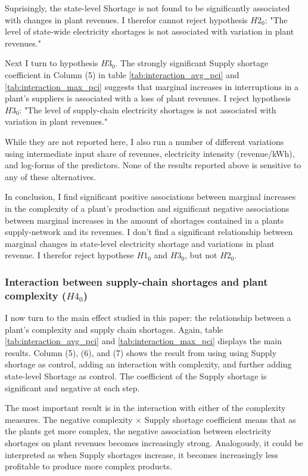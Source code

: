 \documentclass[11pt]{article}
\begin{document}
Suprisingly, the state-level Shortage is not found to be significantly associated with changes in plant revenues. I therefor cannot reject hypothesis $H2_0$: "The level of state-wide electricity shortages is not associated with variation in plant revenues." 

Next I turn to hypothesis $H3_0$. The strongly significant Supply shortage coefficient in Column (5) in table \ref{tab:interaction_avg_pci} and \ref{tab:interaction_max_pci} suggests that marginal increases in interruptions in a plant's suppliers is associated with a loss of plant revenues. I reject hypothesis $H3_0$: "The level of supply-chain electricity shortages is not associated with variation in plant revenues." 

While they are not reported here, I also run a number of different variations using intermediate input share of revenues, electricity intensity (revenue/kWh), and log-forms of the predictors. None of the results reported above is sensitive to any of these alternatives.

In conclusion, I find significant positive associations between marginal increases in the complexity of a plant's production and significant negative associations between marginal increases in the amount of shortages contained in a plants supply-network and its revenues. I don't find a significant relationship between marginal changes in state-level electricity shortage and variations in plant revenue. I therefor reject hypothese $H1_0$ and $H3_0$, but not $H2_0$.

\subsubsection{Interaction between supply-chain shortages and plant complexity ($H4_0$)}
\label{sub:h4}
I now turn to the main effect studied in this paper: the relationship between a plant's complexity and supply chain shortages. Again, table \ref{tab:interaction_avg_pci} and \ref{tab:interaction_max_pci} displays the main results. Column (5), (6), and (7) shows the result from using using Supply shortage as control, adding an interaction with complexity, and further adding state-level Shortage as control. The coefficient of the Supply shortage is significant and negative at each step. 

The most important result is in the interaction with either of the complexity measures. The negative complexity $\times$ Supply shortage coefficient means that as the plants get more complex, the negative association between electricity shortages on plant revenues becomes increasingly strong. Analogously, it could be interpreted as when Supply shortages increase, it becomes increasingly less profitable to produce more complex products.
\end{document}
